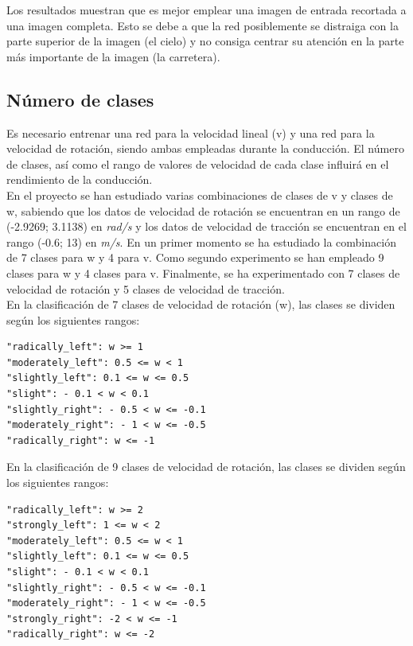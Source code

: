 Los resultados muestran que es mejor emplear una imagen de entrada recortada a una imagen completa. Esto se debe a que la red posiblemente se distraiga con la parte superior de la imagen (el cielo) y no consiga centrar su atención en la parte más importante de la imagen (la carretera).



\subsection{Número de clases}

Es necesario entrenar una red para la velocidad lineal (v) y una red para la velocidad de rotación, siendo ambas empleadas durante la conducción. El número de clases, así como el rango de valores de velocidad de cada clase influirá en el rendimiento de la conducción. \\

En el proyecto se han estudiado varias combinaciones de clases de v y clases de w, sabiendo que los datos de velocidad de rotación se encuentran en un rango de (-2.9269; 3.1138) en \textit{rad/s} y los datos de velocidad de tracción se encuentran en el rango (-0.6; 13) en \textit{m/s}. En un primer momento se ha estudiado la combinación de 7 clases para w y 4 para v. Como segundo experimento se han empleado 9 clases para w y 4 clases para v. Finalmente, se ha experimentado con 7 clases de velocidad de rotación y 5 clases de velocidad de tracción.\\


En la clasificación de 7 clases de velocidad de rotación (w), las clases se dividen según los siguientes rangos:

\vspace{10pt}
\begin{lstlisting}
"radically_left": w >= 1
"moderately_left": 0.5 <= w < 1
"slightly_left": 0.1 <= w <= 0.5
"slight": - 0.1 < w < 0.1
"slightly_right": - 0.5 < w <= -0.1
"moderately_right": - 1 < w <= -0.5
"radically_right": w <= -1
\end{lstlisting}
\vspace{20pt}


En la clasificación de 9 clases de velocidad de rotación, las clases se dividen según los siguientes rangos:

\vspace{10pt}
\begin{lstlisting}
"radically_left": w >= 2
"strongly_left": 1 <= w < 2
"moderately_left": 0.5 <= w < 1
"slightly_left": 0.1 <= w <= 0.5
"slight": - 0.1 < w < 0.1
"slightly_right": - 0.5 < w <= -0.1
"moderately_right": - 1 < w <= -0.5
"strongly_right": -2 < w <= -1
"radically_right": w <= -2
\end{lstlisting}
\vspace{20pt}

